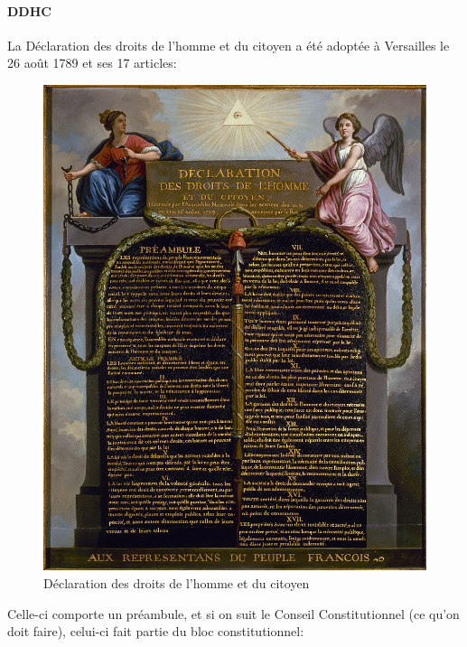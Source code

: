 \documentclass[math]{cours}
\begin{document}
\paragraph{DDHC}
La Déclaration des droits de l'homme et du citoyen a été adoptée à Versailles le 26 août 1789 et ses 17 articles:
\begin{figure}[h!]
	\centering
	\includegraphics[width=\linewidth]{ddhc}
	\caption{Déclaration des droits de l'homme et du citoyen}
	\label{fig:ddhc}
\end{figure}
Celle-ci comporte un préambule, et si on suit le Conseil Constitutionnel (ce qu'on doit faire), celui-ci fait partie du bloc constitutionnel:
\end{document}
